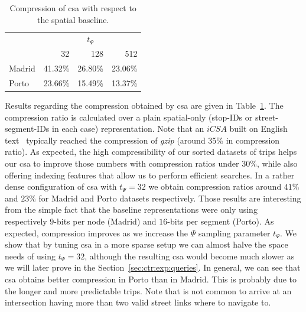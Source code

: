 	\begin{table}[ht]
	\begin{center}
	  \begin{tabular}{|l|*{3}{r}|}
	  \cline{2-4}
	  \multicolumn{1}{c|}{} & \multicolumn{3}{c|}{$t_{\Psi}$ } \\
	  \multicolumn{1}{c|}{} & 32 & 128 & 512 \\
	  \hline
	  Madrid & 41.32\% & 26.80\% & 23.06\% \\
	  Porto & 23.66\% & 15.49\% & 13.37\% \\
	  \hline
	  \end{tabular}
	\caption{Compression of \acrshort{csa} with respect to the spatial baseline.}
	\label{table:ctr:exp:space:spat}
	\end{center}
	\end{table}

	Results regarding the compression obtained by \gls{csa} are given in Table~\ref{table:ctr:exp:space:spat}.
	The compression ratio is calculated over a plain spatial-only (stop-IDs or street-segment-IDs in each case) representation.
	Note that an $iCSA$  built on English text~\cite{FBNCPR12} typically
	reached the compression of {\em gzip} (around 35\% in compression ratio).
	As expected, the high compressibility of our sorted datasets of trips helps our \gls{csa} to improve those numbers with compression ratios under 30\%, while also offering indexing features
	that allow us to perform efficient searches.
	In a rather dense 
	configuration of \gls{csa} with $t_{\Psi}=32$ we obtain compression ratios around $41$\% and $23$\% for Madrid and Porto datasets respectively.
	Those results are interesting from the simple fact that the baseline representations were only using respectively 
	$9$-bits per node (Madrid) and $16$-bits per segment (Porto). 
	As expected, compression improves as we increase the $\Psi$ sampling parameter $t_{\Psi}$. We show that by tuning 
	\gls{csa} in a more sparse setup we can almost halve the space needs of using $t_{\Psi}=32$, although the resulting \gls{csa} would become
	much slower as we will later prove in the Section~\ref{sec:ctr:exp:queries}.
	In general, we can see that \gls{csa} obtains better compression in Porto than in Madrid. This is probably due to the longer and
	more predictable trips. Note that is not common to arrive at an intersection having more than two valid street links where to navigate to.


